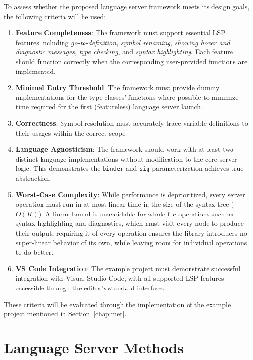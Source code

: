 To assess whether the proposed language server framework meets its design goals, the following criteria will be used:

\begin{enumerate}
  \item \textbf{Feature Completeness}: The framework must support essential LSP features including \textit{go-to-definition}, \textit{symbol renaming}, \textit{showing hover and diagnostic messages}, \textit{type checking}, and \textit{syntax highlighting}. 
  Each feature should function correctly when the corresponding user-provided functions are implemented.

  \item \textbf{Minimal Entry Threshold}: The framework must provide dummy implementations for the type classes' functions where possible to minimize time required for the first (featureless) language server launch.
  
  \item \textbf{Correctness}: Symbol resolution must accurately trace variable definitions to their usages within the correct scope.
  
  \item \textbf{Language Agnosticism}: The framework should work with at least two distinct language implementations without modification to the core server logic. 
  This demonstrates the \texttt{binder} and \texttt{sig} parameterization achieves true abstraction.
  
  \item \textbf{Worst-Case Complexity}: While performance is deprioritized, every server operation must run in at most linear time in the size of the syntax tree ($O(K)$). A linear bound is unavoidable for whole-file operations such as syntax highlighting and diagnostics, which must visit every node to produce their output; requiring it of every operation ensures the library introduces no super-linear behavior of its own, while leaving room for individual operations to do better.
  
  \item \textbf{VS Code Integration}: The example project must demonstrate successful integration with Visual Studio Code, with all supported LSP features accessible through the editor's standard interface.
\end{enumerate}

These criteria will be evaluated through the implementation of the example project mentioned in Section~\ref{chap:met}.

\section{Language Server Methods}

